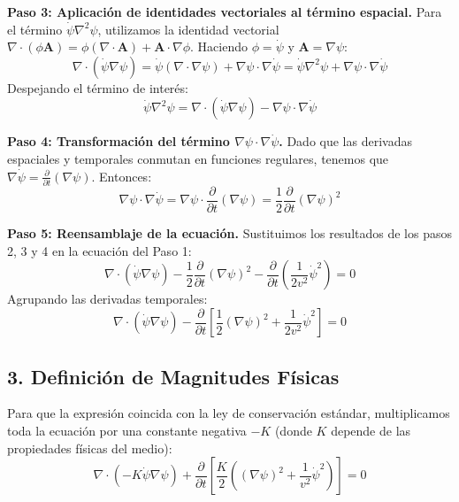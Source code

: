 \documentclass[a4paper]{article}
\begin{document}
\textbf{Paso 3: Aplicación de identidades vectoriales al término espacial.}
Para el término $\dot{\psi} \nabla^2\psi$, utilizamos la identidad vectorial $\nabla \cdot (\phi \mathbf{A}) = \phi (\nabla \cdot \mathbf{A}) + \mathbf{A} \cdot \nabla \phi$. 
Haciendo $\phi = \dot{\psi}$ y $\mathbf{A} = \nabla \psi$:
\begin{equation}
    \nabla \cdot (\dot{\psi} \nabla \psi) = \dot{\psi} (\nabla \cdot \nabla \psi) + \nabla \psi \cdot \nabla \dot{\psi} = \dot{\psi} \nabla^2\psi + \nabla \psi \cdot \nabla \dot{\psi}
\end{equation}
Despejando el término de interés:
\begin{equation}
    \dot{\psi} \nabla^2\psi = \nabla \cdot (\dot{\psi} \nabla \psi) - \nabla \psi \cdot \nabla \dot{\psi}
\end{equation}

\textbf{Paso 4: Transformación del término $\nabla \psi \cdot \nabla \dot{\psi}$.}
Dado que las derivadas espaciales y temporales conmutan en funciones regulares, tenemos que $\nabla \dot{\psi} = \frac{\partial}{\partial t} (\nabla \psi)$. Entonces:
\begin{equation}
    \nabla \psi \cdot \nabla \dot{\psi} = \nabla \psi \cdot \frac{\partial}{\partial t} (\nabla \psi) = \frac{1}{2} \frac{\partial}{\partial t} (\nabla \psi)^2
\end{equation}

\textbf{Paso 5: Reensamblaje de la ecuación.}
Sustituimos los resultados de los pasos 2, 3 y 4 en la ecuación del Paso 1:
\begin{equation}
    \nabla \cdot (\dot{\psi} \nabla \psi) - \frac{1}{2} \frac{\partial}{\partial t} (\nabla \psi)^2 - \frac{\partial}{\partial t} \left( \frac{1}{2v^2} \dot{\psi}^2 \right) = 0
\end{equation}
Agrupando las derivadas temporales:
\begin{equation}
    \nabla \cdot (\dot{\psi} \nabla \psi) - \frac{\partial}{\partial t} \left[ \frac{1}{2} (\nabla \psi)^2 + \frac{1}{2v^2} \dot{\psi}^2 \right] = 0
\end{equation}

\subsection*{3. Definición de Magnitudes Físicas}
Para que la expresión coincida con la ley de conservación estándar, multiplicamos toda la ecuación por una constante negativa $-K$ (donde $K$ depende de las propiedades físicas del medio):
\begin{equation}
    \nabla \cdot (-K \dot{\psi} \nabla \psi) + \frac{\partial}{\partial t} \left[ \frac{K}{2} \left( (\nabla \psi)^2 + \frac{1}{v^2} \dot{\psi}^2 \right) \right] = 0
\end{equation}
\end{document}
